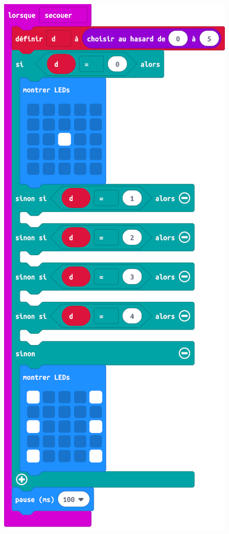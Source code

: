 \begin{minipage}[t]{0.5\linewidth}
\begin{methode}
    \includegraphics[width=0.85\linewidth]{res/mbDe6FacesN2propos.png}
    \end{methode}
\end{minipage}
\hfill
